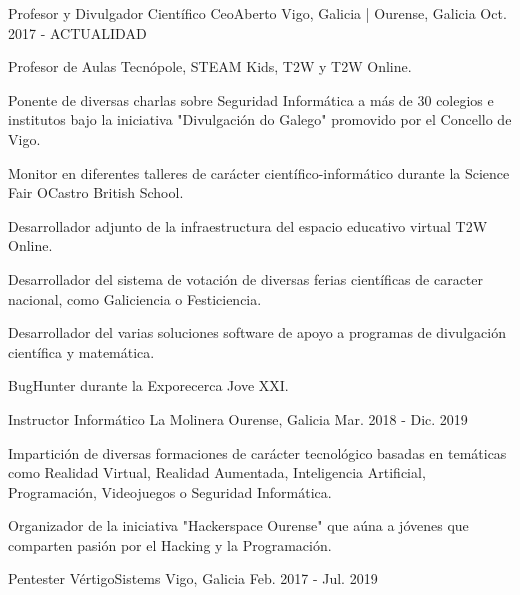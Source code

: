 \documentclass[11pt, a4paper]{style}
\begin{document}
\begin{cventries}
  \cventry
    {Profesor y Divulgador Científico} %
    {CeoAberto} %
    {Vigo, Galicia | Ourense, Galicia} %
    {Oct. 2017 - ACTUALIDAD} %
    {
      \begin{cvitems} %
        \item {Profesor de Aulas Tecnópole, STEAM Kids, T2W y T2W Online.}
        \item {Ponente de diversas charlas sobre Seguridad Informática a más de 30 colegios e institutos bajo la iniciativa "Divulgación do Galego" promovido por el Concello de Vigo.}
        \item {Monitor en diferentes talleres de carácter científico-informático durante la Science Fair OCastro British School.}
        \item {Desarrollador adjunto de la infraestructura del espacio educativo virtual T2W Online.}
        \item {Desarrollador del sistema de votación de diversas ferias científicas de caracter nacional, como Galiciencia o Festiciencia.}
        \item {Desarrollador del varias soluciones software de apoyo a programas de divulgación científica y matemática.}
        \item {BugHunter durante la Exporecerca Jove XXI.}
      \end{cvitems}
    }
  \cventry
    {Instructor Informático} %
    {La Molinera} %
    {Ourense, Galicia} %
    {Mar. 2018 - Dic. 2019} %
    {
      \begin{cvitems} %
        \item {Impartición de diversas formaciones de carácter tecnológico basadas en temáticas como Realidad Virtual, Realidad Aumentada, Inteligencia Artificial, Programación, Videojuegos o Seguridad Informática.}
        \item {Organizador de la iniciativa "Hackerspace Ourense" que aúna a jóvenes que comparten pasión por el Hacking y la Programación.}
      \end{cvitems}
    }
  \cventry
    {Pentester} %
    {VértigoSistems} %
    {Vigo, Galicia} %
    {Feb. 2017 - Jul. 2019} %

\end{cventries}
\end{document}
